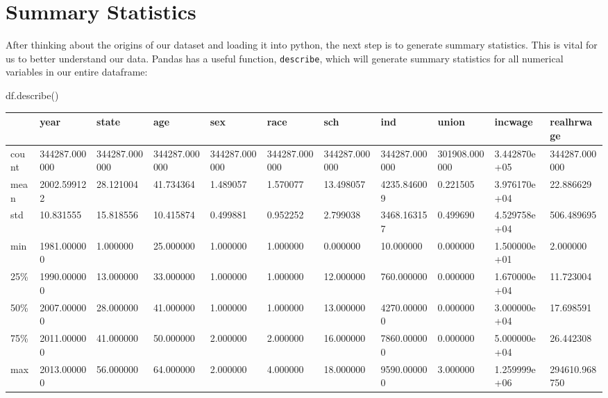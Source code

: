 \documentclass[
  letterpaper,
  DIV=11,
  numbers=noendperiod]{scrreprt}
\newenvironment{Shaded}{\begin{snugshade}}{\end{snugshade}}
\newcommand{\NormalTok}[1]{\textcolor[rgb]{0.00,0.23,0.31}{#1}}
\begin{document}
\hypertarget{summary-statistics}{%
\section{Summary Statistics}\label{summary-statistics}}

After thinking about the origins of our dataset and loading it into
python, the next step is to generate summary statistics. This is vital
for us to better understand our data. Pandas has a useful function,
\texttt{describe}, which will generate summary statistics for all
numerical variables in our entire dataframe:

\begin{Shaded}
\begin{Highlighting}[]
\NormalTok{df.describe()}
\end{Highlighting}
\end{Shaded}

\begin{longtable}[]{@{}lllllllllll@{}}
\toprule\noalign{}
& year & state & age & sex & race & sch & ind & union & incwage &
realhrwage \\
\midrule\noalign{}
\endhead
\bottomrule\noalign{}
\endlastfoot
count & 344287.000000 & 344287.000000 & 344287.000000 & 344287.000000 &
344287.000000 & 344287.000000 & 344287.000000 & 301908.000000 &
3.442870e+05 & 344287.000000 \\
mean & 2002.599122 & 28.121004 & 41.734364 & 1.489057 & 1.570077 &
13.498057 & 4235.846009 & 0.221505 & 3.976170e+04 & 22.886629 \\
std & 10.831555 & 15.818556 & 10.415874 & 0.499881 & 0.952252 & 2.799038
& 3468.163157 & 0.499690 & 4.529758e+04 & 506.489695 \\
min & 1981.000000 & 1.000000 & 25.000000 & 1.000000 & 1.000000 &
0.000000 & 10.000000 & 0.000000 & 1.500000e+01 & 2.000000 \\
25\% & 1990.000000 & 13.000000 & 33.000000 & 1.000000 & 1.000000 &
12.000000 & 760.000000 & 0.000000 & 1.670000e+04 & 11.723004 \\
50\% & 2007.000000 & 28.000000 & 41.000000 & 1.000000 & 1.000000 &
13.000000 & 4270.000000 & 0.000000 & 3.000000e+04 & 17.698591 \\
75\% & 2011.000000 & 41.000000 & 50.000000 & 2.000000 & 2.000000 &
16.000000 & 7860.000000 & 0.000000 & 5.000000e+04 & 26.442308 \\
max & 2013.000000 & 56.000000 & 64.000000 & 2.000000 & 4.000000 &
18.000000 & 9590.000000 & 3.000000 & 1.259999e+06 & 294610.968750 \\
\end{longtable}
\end{document}
